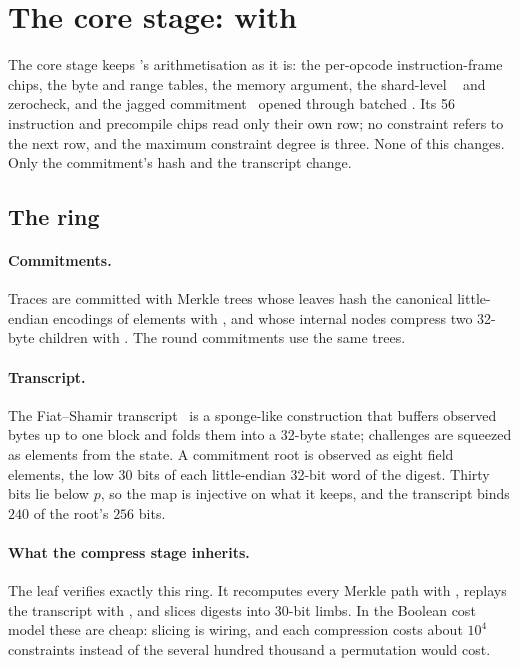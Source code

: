 \section{The core stage: \KB{} with \Blake{}}\label{sec:core}

The core stage keeps \Ziren{}'s arithmetisation as it is: the per-opcode instruction-frame chips, the byte and range tables, the memory argument, the shard-level \LogUp{}~\citep{logup-gkr} and zerocheck, and the jagged commitment~\citep{jagged-pcs} opened through batched \WHIR{}. Its 56 instruction and precompile chips read only their own row; no constraint refers to the next row, and the maximum constraint degree is three. None of this changes. Only the commitment's hash and the transcript change.

\subsection{The \Blake{} ring}

\paragraph{Commitments.} Traces are committed with Merkle trees whose leaves hash the canonical little-endian encodings of \KB{} elements with \Blake{}, and whose internal nodes compress two 32-byte children with \Blake{}. The \WHIR{} round commitments use the same trees.

\paragraph{Transcript.} The Fiat--Shamir transcript~\citep{fiat-shamir,bcs16} is a \Blake{} sponge-like construction that buffers observed bytes up to one block and folds them into a 32-byte state; challenges are squeezed as \KB{} elements from the state. A commitment root is observed as eight field elements, the low $30$ bits of each little-endian 32-bit word of the digest. Thirty bits lie below $p$, so the map is injective on what it keeps, and the transcript binds $240$ of the root's $256$ bits.

\paragraph{What the compress stage inherits.} The leaf verifies exactly this ring. It recomputes every Merkle path with \Blake{}, replays the transcript with \Blake{}, and slices digests into 30-bit limbs. In the Boolean cost model these are cheap: slicing is wiring, and each compression costs about $10^4$ \AND{} constraints instead of the several hundred thousand a \Poseidon{} permutation would cost.

